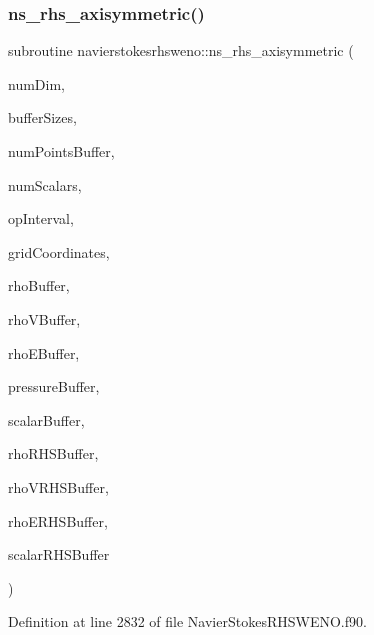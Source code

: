 \subsubsection{\texorpdfstring{ns\+\_\+rhs\+\_\+axisymmetric()}{ns\_rhs\_axisymmetric()}}
{\footnotesize\ttfamily subroutine navierstokesrhsweno\+::ns\+\_\+rhs\+\_\+axisymmetric (\begin{DoxyParamCaption}\item[{integer(kind=4)}]{num\+Dim,  }\item[{integer(kind=8), dimension(numdim)}]{buffer\+Sizes,  }\item[{integer(kind=8)}]{num\+Points\+Buffer,  }\item[{integer(kind=4)}]{num\+Scalars,  }\item[{integer(kind=8), dimension(2$\ast$numdim), intent(in)}]{op\+Interval,  }\item[{real(kind=8), dimension(numdim$\ast$numpointsbuffer), intent(in), target}]{grid\+Coordinates,  }\item[{real(kind=8), dimension(numpointsbuffer), intent(in)}]{rho\+Buffer,  }\item[{real(kind=8), dimension(numdim$\ast$numpointsbuffer), intent(in), target}]{rho\+V\+Buffer,  }\item[{real(kind=8), dimension(numpointsbuffer), intent(in)}]{rho\+E\+Buffer,  }\item[{real(kind=8), dimension(numpointsbuffer), intent(in)}]{pressure\+Buffer,  }\item[{real(kind=8), dimension(numscalars$\ast$numpointsbuffer), intent(in), target}]{scalar\+Buffer,  }\item[{real(kind=8), dimension(numpointsbuffer), intent(inout)}]{rho\+R\+H\+S\+Buffer,  }\item[{real(kind=8), dimension(numdim$\ast$numpointsbuffer), intent(inout), target}]{rho\+V\+R\+H\+S\+Buffer,  }\item[{real(kind=8), dimension(numpointsbuffer), intent(inout)}]{rho\+E\+R\+H\+S\+Buffer,  }\item[{real(kind=8), dimension(numscalars$\ast$numpointsbuffer), intent(inout), target}]{scalar\+R\+H\+S\+Buffer }\end{DoxyParamCaption})}



Definition at line 2832 of file Navier\+Stokes\+R\+H\+S\+W\+E\+N\+O.\+f90.

\hypertarget{namespacenavierstokesrhsweno_abfdc9aec9f5858f83d007f57efc42de0}{}\label{namespacenavierstokesrhsweno_abfdc9aec9f5858f83d007f57efc42de0} 
